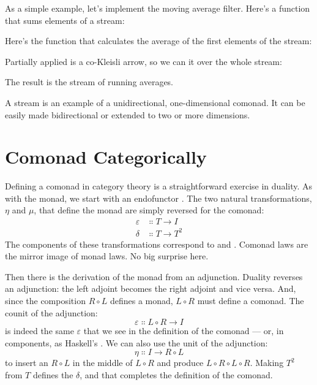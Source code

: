 As a simple example, let's implement the moving average filter. Here's a
function that sums  elements of a stream:

Here's the function that calculates the average of the first 
elements of the stream:

Partially applied  is a co-Kleisli arrow, so we can
 it over the whole stream:

The result is the stream of running averages.

A stream is an example of a unidirectional, one-dimensional comonad. It
can be easily made bidirectional or extended to two or more dimensions.

\section{Comonad Categorically}

Defining a comonad in category theory is a straightforward exercise in
duality. As with the monad, we start with an endofunctor . The
two natural transformations, $\eta$ and $\mu$, that define the monad are simply
reversed for the comonad:
\begin{align*}
  \varepsilon & \Colon T \to I   \\
  \delta      & \Colon T \to T^2
\end{align*}
The components of these transformations correspond to 
and . Comonad laws are the mirror image of monad laws.
No big surprise here.

Then there is the derivation of the monad from an adjunction. Duality
reverses an adjunction: the left adjoint becomes the right adjoint and
vice versa. And, since the composition $R \circ L$ defines a monad,
$L \circ R$ must define a comonad. The counit of the adjunction:
\[\varepsilon \Colon L \circ R \to I\]
is indeed the same $\varepsilon$ that we see in the definition of the comonad ---
or, in components, as Haskell's . We can also use the
unit of the adjunction:
\[\eta \Colon I \to R \circ L\]
to insert an $R \circ L$ in the middle of $L \circ R$ and
produce $L \circ R \circ L \circ R$. Making $T^2$ from $T$
defines the $\delta$, and that completes the definition of the comonad.

